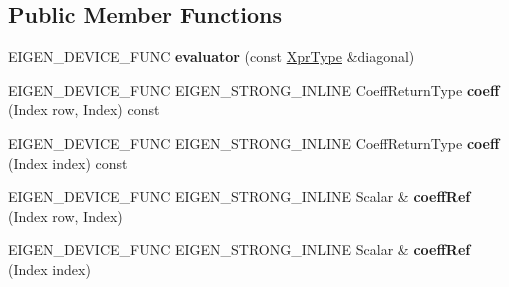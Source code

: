 \subsection*{Public Member Functions}
\begin{DoxyCompactItemize}
\item 
\mbox{\label{struct_eigen_1_1internal_1_1evaluator_3_01_diagonal_3_01_arg_type_00_01_diag_index_01_4_01_4_a520064af9f6dc7424ea66f641d50cd46}} 
E\+I\+G\+E\+N\+\_\+\+D\+E\+V\+I\+C\+E\+\_\+\+F\+U\+NC {\bfseries evaluator} (const \mbox{\hyperlink{class_eigen_1_1_diagonal}{Xpr\+Type}} \&diagonal)
\item 
\mbox{\label{struct_eigen_1_1internal_1_1evaluator_3_01_diagonal_3_01_arg_type_00_01_diag_index_01_4_01_4_abc2e122d0f8923b27883b07280241973}} 
E\+I\+G\+E\+N\+\_\+\+D\+E\+V\+I\+C\+E\+\_\+\+F\+U\+NC E\+I\+G\+E\+N\+\_\+\+S\+T\+R\+O\+N\+G\+\_\+\+I\+N\+L\+I\+NE Coeff\+Return\+Type {\bfseries coeff} (Index row, Index) const
\item 
\mbox{\label{struct_eigen_1_1internal_1_1evaluator_3_01_diagonal_3_01_arg_type_00_01_diag_index_01_4_01_4_a3e5b569223036cceb13d67088451f6f7}} 
E\+I\+G\+E\+N\+\_\+\+D\+E\+V\+I\+C\+E\+\_\+\+F\+U\+NC E\+I\+G\+E\+N\+\_\+\+S\+T\+R\+O\+N\+G\+\_\+\+I\+N\+L\+I\+NE Coeff\+Return\+Type {\bfseries coeff} (Index index) const
\item 
\mbox{\label{struct_eigen_1_1internal_1_1evaluator_3_01_diagonal_3_01_arg_type_00_01_diag_index_01_4_01_4_a5ba4113dd171a53a9714dd8fb09e3d4e}} 
E\+I\+G\+E\+N\+\_\+\+D\+E\+V\+I\+C\+E\+\_\+\+F\+U\+NC E\+I\+G\+E\+N\+\_\+\+S\+T\+R\+O\+N\+G\+\_\+\+I\+N\+L\+I\+NE Scalar \& {\bfseries coeff\+Ref} (Index row, Index)
\item 
\mbox{\label{struct_eigen_1_1internal_1_1evaluator_3_01_diagonal_3_01_arg_type_00_01_diag_index_01_4_01_4_ae9ab3ba6de1b89f0dfa3c28945e01f68}} 
E\+I\+G\+E\+N\+\_\+\+D\+E\+V\+I\+C\+E\+\_\+\+F\+U\+NC E\+I\+G\+E\+N\+\_\+\+S\+T\+R\+O\+N\+G\+\_\+\+I\+N\+L\+I\+NE Scalar \& {\bfseries coeff\+Ref} (Index index)
\end{DoxyCompactItemize}
